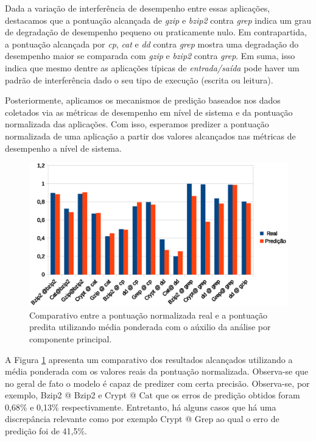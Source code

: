 Dada a variação de interferência de desempenho entre essas aplicações,
destacamos que a pontuação alcançada de \textit{gzip} e \textit{bzip2} contra
\textit{grep} indica um grau de degradação de desempenho pequeno ou
praticamente nulo. Em contrapartida, a pontuação alcançada por \textit{cp},
\textit{cat} e \textit{dd} contra \textit{grep} mostra uma degradação do
desempenho maior se comparada com \textit{gzip} e \textit{bzip2} contra
\textit{grep}. Em suma, isso indica que mesmo dentre as aplicações típicas de
\textit{entrada/saída} pode haver um padrão de interferência dado o seu tipo de
execução (escrita ou leitura). 

Posteriormente, aplicamos os mecanismos de predição baseados nos dados
coletados via as métricas de desempenho em nível de sistema e da pontuação
normalizada das aplicações. Com isso, esperamos predizer a pontuação
normalizada de uma aplicação a partir dos valores alcançados nas métricas de
desempenho a nível de sistema. 

\begin{figure}[!htb]
\centering
\includegraphics [keepaspectratio=true,scale=0.5]{graficos/mean_predict.eps}
\caption{Comparativo entre a pontuação normalizada real e a pontuação predita utilizando média ponderada com o aúxilio da análise por componente principal.}
\label{mean_predict}
\end{figure}   

A Figura \ref{mean_predict} apresenta um comparativo dos resultados alcançados
utilizando a média ponderada com os valores reais da pontuação normalizada.
Observa-se que no geral de fato o modelo é capaz de predizer com certa
precisão. Observa-se, por exemplo, Bzip2 @ Bzip2 e Crypt @ Cat que os erros de
predição obtidos foram 0,68\% e 0,13\% respectivamente. Entretanto, há alguns
casos que há uma discrepância relevante como por exemplo Crypt @ Grep ao qual o
erro de predição foi de 41,5\%.
   

